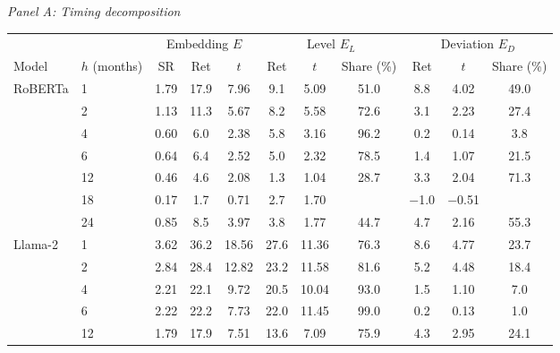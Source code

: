 \begin{table}[htbp]
{\footnotesize
\textit{Panel A: Timing decomposition}\\[2pt]
\begin{adjustbox}{max width=\linewidth, max totalheight=0.28\textheight}
\begin{tabular}{llccccccccc}
\toprule
\multicolumn{2}{c}{} & \multicolumn{3}{c}{Embedding $E$} & \multicolumn{3}{c}{Level $E_L$} & \multicolumn{3}{c}{Deviation $E_D$} \\
\cmidrule(lr){3-5} \cmidrule(lr){6-8} \cmidrule(lr){9-11}
Model & $h$ (months) & SR & Ret & $t$ & Ret & $t$ & Share (\%) & Ret & $t$ & Share (\%) \\
\midrule
RoBERTa & 1 & 1.79 & 17.9 & \phantom{0}7.96 & \phantom{0}9.1 & \phantom{0}5.09 & 51.0 & \phantom{$-$}8.8 & \phantom{$-$}4.02 & 49.0 \\
 & 2 & 1.13 & 11.3 & \phantom{0}5.67 & \phantom{0}8.2 & \phantom{0}5.58 & 72.6 & \phantom{$-$}3.1 & \phantom{$-$}2.23 & 27.4 \\
 & 4 & 0.60 & \phantom{0}6.0 & \phantom{0}2.38 & \phantom{0}5.8 & \phantom{0}3.16 & 96.2 & \phantom{$-$}0.2 & \phantom{$-$}0.14 & \phantom{0}3.8 \\
 & 6 & 0.64 & \phantom{0}6.4 & \phantom{0}2.52 & \phantom{0}5.0 & \phantom{0}2.32 & 78.5 & \phantom{$-$}1.4 & \phantom{$-$}1.07 & 21.5 \\
 & 12 & 0.46 & \phantom{0}4.6 & \phantom{0}2.08 & \phantom{0}1.3 & \phantom{0}1.04 & 28.7 & \phantom{$-$}3.3 & \phantom{$-$}2.04 & 71.3 \\
 & 18 & 0.17 & \phantom{0}1.7 & \phantom{0}0.71 & \phantom{0}2.7 & \phantom{0}1.70 &  & $-$1.0 & $-$0.51 &  \\
 & 24 & 0.85 & \phantom{0}8.5 & \phantom{0}3.97 & \phantom{0}3.8 & \phantom{0}1.77 & 44.7 & \phantom{$-$}4.7 & \phantom{$-$}2.16 & 55.3 \\
\midrule
Llama-2 & 1 & 3.62 & 36.2 & 18.56 & 27.6 & 11.36 & 76.3 & \phantom{$-$}8.6 & \phantom{$-$}4.77 & 23.7 \\
 & 2 & 2.84 & 28.4 & 12.82 & 23.2 & 11.58 & 81.6 & \phantom{$-$}5.2 & \phantom{$-$}4.48 & 18.4 \\
 & 4 & 2.21 & 22.1 & \phantom{0}9.72 & 20.5 & 10.04 & 93.0 & \phantom{$-$}1.5 & \phantom{$-$}1.10 & \phantom{0}7.0 \\
 & 6 & 2.22 & 22.2 & \phantom{0}7.73 & 22.0 & 11.45 & 99.0 & \phantom{$-$}0.2 & \phantom{$-$}0.13 & \phantom{0}1.0 \\
 & 12 & 1.79 & 17.9 & \phantom{0}7.51 & 13.6 & \phantom{0}7.09 & 75.9 & \phantom{$-$}4.3 & \phantom{$-$}2.95 & 24.1 \\

\end{tabular}
\end{adjustbox}}
\end{table}
